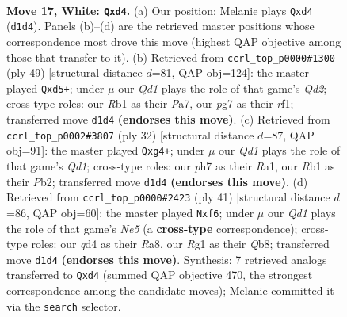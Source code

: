 \documentclass[11pt]{article}
\begin{document}
\clearpage

\begin{figure}[p]\centering
\begin{subfigure}{0.46\textwidth}\centering
\resizebox{\linewidth}{!}{%
\newchessgame
\chessboard[
  setfen={2kr3r/ppp2ppp/4p3/4N3/2Pq4/8/PP2KPbP/1R1Q2R1 w - - 0 17},
  showmover=false,
  pgfstyle=straightmove, color=movearrow, markmove={d1-d4}
]}
\caption{}
\end{subfigure}\hfill
\begin{subfigure}{0.46\textwidth}\centering
\resizebox{\linewidth}{!}{%
\newchessgame
\chessboard[
  setfen={3r2k1/pp1q1pp1/7p/2RQn3/3p3P/6P1/PP1BPPK1/5R2 b - - 0 25},
  showmover=false,
  pgfstyle=straightmove, color=movearrow, markmove={d7-d5}
]}
\caption{}
\end{subfigure}
\\[4pt]
\begin{subfigure}{0.46\textwidth}\centering
\resizebox{\linewidth}{!}{%
\newchessgame
\chessboard[
  setfen={2kr3r/pp3p2/3b1p2/2pP3p/2P3q1/2N5/PP4PP/R2Q1RK1 w - - 0 17},
  showmover=false,
  pgfstyle=straightmove, color=movearrow, markmove={d1-g4}
]}
\caption{}
\end{subfigure}\hfill
\begin{subfigure}{0.46\textwidth}\centering
\resizebox{\linewidth}{!}{%
\newchessgame
\chessboard[
  setfen={rq3rk1/5pp1/5B2/1N1p3p/P3nP2/3Q3P/1P4P1/R1R3K1 b - - 0 21},
  showmover=false,
  pgfstyle=straightmove, color=movearrow, markmove={e4-f6}
]}
\caption{}
\end{subfigure}
\caption{\textbf{Move 17, White: \texttt{Qxd4}.} (a) Our position; Melanie plays \texttt{Qxd4} (\texttt{d1d4}). Panels (b)--(d) are the retrieved master positions whose correspondence most drove this move (highest QAP objective among those that transfer to it). (b) Retrieved from \texttt{ccrl\_top\_p0000\#1300} (ply 49) [structural distance $d$=81, QAP obj=124]: the master played \texttt{Qxd5+}; under $\mu$ our \emph{Qd1} plays the role of that game's \emph{Qd2}; cross-type roles: our \emph{R}b1 as their \emph{P}a7, our \emph{p}g7 as their \emph{r}f1; transferred move \texttt{d1d4} \textbf{(endorses this move)}. (c) Retrieved from \texttt{ccrl\_top\_p0002\#3807} (ply 32) [structural distance $d$=87, QAP obj=91]: the master played \texttt{Qxg4+}; under $\mu$ our \emph{Qd1} plays the role of that game's \emph{Qd1}; cross-type roles: our \emph{p}h7 as their \emph{R}a1, our \emph{R}b1 as their \emph{P}b2; transferred move \texttt{d1d4} \textbf{(endorses this move)}. (d) Retrieved from \texttt{ccrl\_top\_p0000\#2423} (ply 41) [structural distance $d$=86, QAP obj=60]: the master played \texttt{Nxf6}; under $\mu$ our \emph{Qd1} plays the role of that game's \emph{Ne5} (a \textbf{cross-type} correspondence); cross-type roles: our \emph{q}d4 as their \emph{R}a8, our \emph{R}g1 as their \emph{Q}b8; transferred move \texttt{d1d4} \textbf{(endorses this move)}. Synthesis: 7 retrieved analogs transferred to \texttt{Qxd4} (summed QAP objective 470, the strongest correspondence among the candidate moves); Melanie committed it via the \texttt{search} selector.}
\label{fig:thought-m32}
\end{figure}
\end{document}
